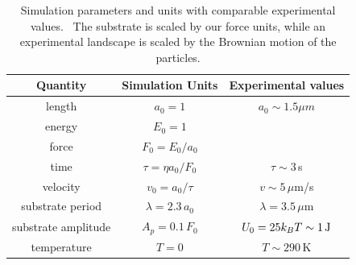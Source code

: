 \documentclass[preprint,showpacs,preprintnumbers,amsmath,amssymb,aps,prb]{revtex4-1}
\theoremstyle{remark}
\begin{document}
\begin{table}[h!]
\centering
\caption{Simulation parameters and units with comparable
  experimental values.~\cite{Juniper2015,Juniper2017} The substrate is scaled by our force units, while an experimental landscape is scaled by the Brownian motion of the particles. }%
\begin{ruledtabular}
\begin{tabular}{c c c } 
Quantity & Simulation Units & Experimental values\\
\hline
length &  $a_0 = 1$ & $ a_0 \sim 1.5 \mu m$\\
energy & $E_0 = 1$ & \\ %
force & $F_0 = E_0 / a_0$ & \\ %
time &  $ \tau = \eta a_0 / F_0 $ & $ \tau \sim 3$\,s\\
velocity &  $ v_0 = a_0 / \tau $ &  $v \sim 5\,\mu$m/s \\
substrate period & $\lambda = 2.3\,a_0$ & $\lambda = 3.5\,\mu$m \\
substrate amplitude & $A_p = 0.1\,F_0$ & $U_0 = 25 k_B T \sim 1\, {\rm J}$ \\ %
temperature & $T = 0$  & $T \sim 290\,$K  \\
\end{tabular}
\end{ruledtabular}
\label{tab:1}
\end{table}
\end{document}
